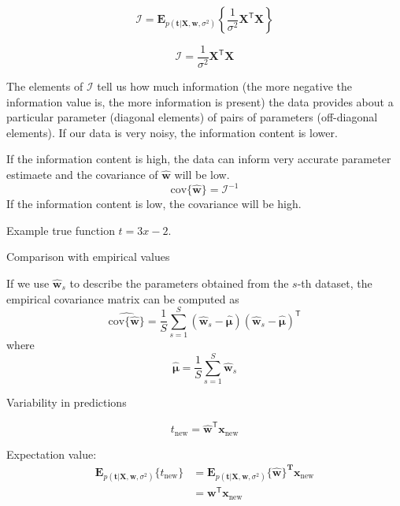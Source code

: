 \documentclass[a4paper,11pt]{article} %
\begin{document}
\begin{equation}
\mathcal{I} = \mathbf{E}_{p(\mathbf{t}|\mathbf{X},\mathbf{w},\sigma^2)}
\left\{ \frac{1}{\sigma^2} \mathbf{X}^{\mathsf{T}}\mathbf{X}
\right\}
\end{equation}

\begin{equation}
\mathcal{I} = \frac{1}{\sigma^2} \mathbf{X}^{\mathsf{T}}\mathbf{X}
\end{equation}

The elements of $\mathcal{I}$ tell us how much information (the more negative the
information value is, the more information is present) the data provides about
a particular parameter (diagonal elements) of pairs of parameters (off-diagonal elements).
If our data is very noisy, the information content is lower.

If the information content is high, the data can inform very accurate parameter
estimaete and the covariance of $\widehat{\mathbf{w}}$ will be low.
\begin{equation*}
\mathrm{cov}\{\widehat{\mathbf{w}}\} = \mathcal{I}^{-1}
\end{equation*}
If the information content is low, the covariance will be high.

Example true function $t = 3x - 2$.

Comparison with empirical values


If we use $\widehat{\mathbf{w}}_{s}$ to describe the parameters obtained from the $s$-th
dataset, the empirical covariance matrix can be computed as
\begin{equation*}
\widehat{ \mathrm{cov} \{ \widehat{\mathbf{w}} \} } = \frac{1}{S} \sum_{s=1}^{S}
\left( \widehat{\mathbf{w}}_{s} - \widehat{\boldsymbol{\mu}} \right)
\left( \widehat{\mathbf{w}}_{s} - \widehat{\boldsymbol{\mu}} \right)^{\mathsf{T}}
\end{equation*}
where
\begin{equation*}
\widehat{\boldsymbol{\mu}} = \frac{1}{S} \sum_{s=1}^{S} \widehat{\mathbf{w}}_{s}
\end{equation*}

Variability in predictions

\begin{equation}
t_{\mathrm{new}} = \widehat{\mathbf{w}}^{\mathsf{T}}\mathbf{x}_{\mathrm{new}}
\end{equation}

Expectation value:
\begin{align*}
\mathbf{E}_{p(\mathbf{t}|\mathbf{X},\mathbf{w},\sigma^2)}\{t_{\mathrm{new}}\} & =
\mathbf{E}_{p(\mathbf{t}|\mathbf{X},\mathbf{w},\sigma^2)}\{\widehat{\mathbf{w}}\}^{\mathbf{T}}
\mathbf{x}_{\mathrm{new}} \\
& = \mathbf{w}^{\mathsf{T}}\mathbf{x}_{\mathrm{new}}
\end{align*}
\end{document}
